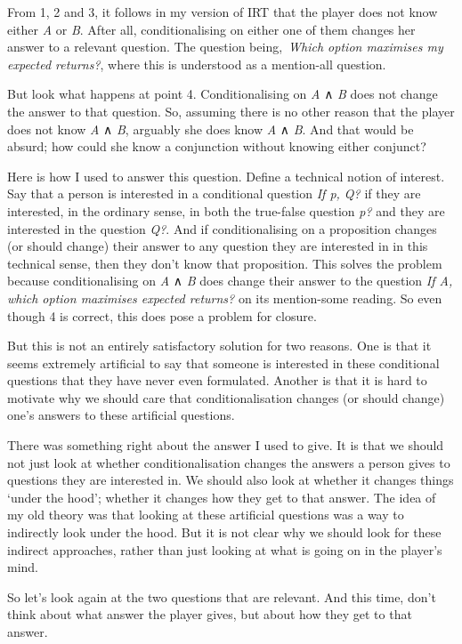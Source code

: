 \documentclass[
  11pt,
]{book}
\begin{document}
From 1, 2 and 3, it follows in my version of IRT that the player does not know either \emph{A} or \emph{B}. After all, conditionalising on either one of them changes her answer to a relevant question. The question being,~\emph{Which option maximises my expected returns?}, where this is understood as a mention-all question.

But look what happens at point 4. Conditionalising on \emph{A} ∧ \emph{B} does not change the answer to that question. So, assuming there is no other reason that the player does not know \emph{A} ∧ \emph{B}, arguably she does know \emph{A} ∧ \emph{B}. And that would be absurd; how could she know a conjunction without knowing either conjunct?

Here is how I used to answer this question. Define a technical notion of interest. Say that a person is interested in a conditional question \emph{If p, Q?} if they are interested, in the ordinary sense, in both the true-false question \emph{p?} and they are interested in the question \emph{Q?}. And if conditionalising on a proposition changes (or should change) their answer to any question they are interested in in this technical sense, then they don't know that proposition. This solves the problem because conditionalising on \emph{A} ∧ \emph{B} does change their answer to the question \emph{If A, which option maximises expected returns?} on its mention-some reading. So even though 4 is correct, this does pose a problem for closure.

But this is not an entirely satisfactory solution for two reasons. One is that it seems extremely artificial to say that someone is interested in these conditional questions that they have never even formulated. Another is that it is hard to motivate why we should care that conditionalisation changes (or should change) one's answers to these artificial questions.

There was something right about the answer I used to give. It is that we should not just look at whether conditionalisation changes the answers a person gives to questions they are interested in. We should also look at whether it changes things `under the hood'; whether it changes how they get to that answer. The idea of my old theory was that looking at these artificial questions was a way to indirectly look under the hood. But it is not clear why we should look for these indirect approaches, rather than just looking at what is going on in the player's mind.

So let's look again at the two questions that are relevant. And this time, don't think about what answer the player gives, but about how they get to that answer.
\end{document}
